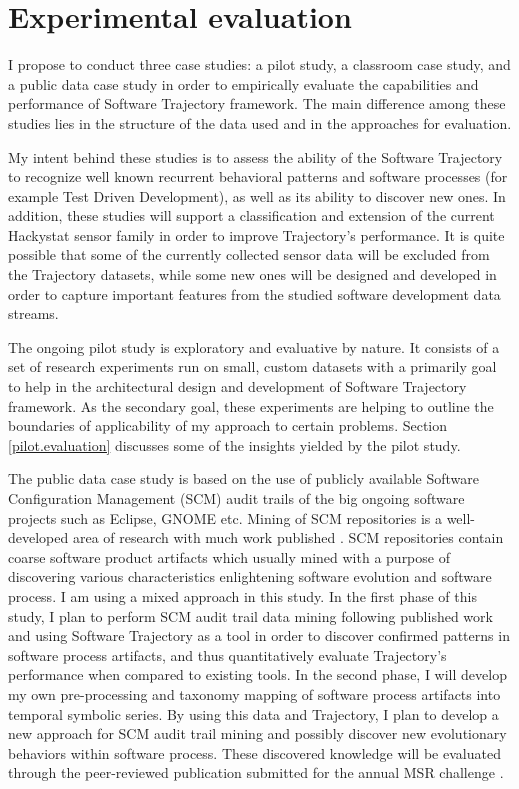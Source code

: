 \chapter{Experimental evaluation} \label{experiments}
I propose to conduct three case studies: a pilot study, a classroom case study, and a public data case study in order to empirically evaluate the capabilities and performance of Software Trajectory framework. The main difference among these studies lies in the structure of the data used and in the approaches for evaluation. 

My intent behind these studies is to assess the ability of the Software Trajectory to recognize well known recurrent behavioral patterns and software processes (for example Test Driven Development), as well as its ability to discover new ones. In addition, these studies will support a classification and extension of the current Hackystat sensor family in order to improve Trajectory's performance. It is quite possible that some of the currently collected sensor data will be excluded from the Trajectory datasets, while some new ones will be designed and developed in order to capture important features from the studied software development data streams.

The ongoing pilot study is exploratory and evaluative by nature. It consists of a set of research experiments run on small, custom datasets with a primarily goal to help in the architectural design and development of Software Trajectory framework. As the secondary goal, these experiments are helping to outline the boundaries of applicability of my approach to certain problems. Section \ref{pilot.evaluation} discusses some of the insights yielded by the pilot study.

The public data case study is based on the use of publicly available Software Configuration Management (SCM) audit trails of the big ongoing software projects such as Eclipse, GNOME etc. Mining of SCM repositories is a well-developed area of research with much work published \cite{citeulike:5043676}. SCM repositories contain coarse software product artifacts which usually mined with a purpose of discovering various characteristics enlightening software evolution and software process. I am using a mixed approach in this study. In the first phase of this study, I plan to perform SCM audit trail data mining following published work and using Software Trajectory as a tool in order to discover confirmed patterns in software process artifacts, and thus quantitatively evaluate Trajectory's performance when compared to existing tools. In the second phase, I will develop my own pre-processing and taxonomy mapping of software process artifacts into temporal symbolic series. By using this data and Trajectory, I plan to develop a new approach for SCM audit trail mining and possibly discover new evolutionary behaviors within software process. These discovered knowledge will be evaluated through the peer-reviewed publication submitted for the annual MSR challenge \cite{citeulike:5043676}.

